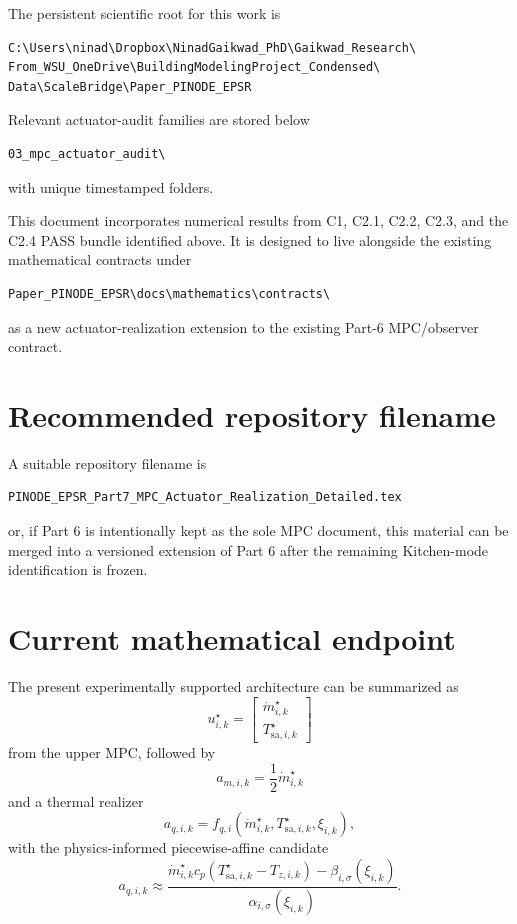 \documentclass[11pt]{article}
\newcommand{\mdot}{\dot m}
\begin{document}
The persistent scientific root for this work is
\begin{verbatim}
C:\Users\ninad\Dropbox\NinadGaikwad_PhD\Gaikwad_Research\
From_WSU_OneDrive\BuildingModelingProject_Condensed\
Data\ScaleBridge\Paper_PINODE_EPSR
\end{verbatim}

Relevant actuator-audit families are stored below
\begin{verbatim}
03_mpc_actuator_audit\
\end{verbatim}
with unique timestamped folders.

This document incorporates numerical results from C1, C2.1, C2.2, C2.3, and
the C2.4 PASS bundle identified above.  It is designed to live alongside the
existing mathematical contracts under
\begin{verbatim}
Paper_PINODE_EPSR\docs\mathematics\contracts\
\end{verbatim}
as a new actuator-realization extension to the existing Part-6 MPC/observer
contract.

\section{Recommended repository filename}

A suitable repository filename is
\begin{verbatim}
PINODE_EPSR_Part7_MPC_Actuator_Realization_Detailed.tex
\end{verbatim}
or, if Part 6 is intentionally kept as the sole MPC document, this material
can be merged into a versioned extension of Part 6 after the remaining
Kitchen-mode identification is frozen.

\section{Current mathematical endpoint}

The present experimentally supported architecture can be summarized as
\begin{equation}
\boxed{
u_{i,k}^{\star}
=
\begin{bmatrix}
\mdot_{i,k}^{\star}\\
T_{\mathrm{sa},i,k}^{\star}
\end{bmatrix}
}
\end{equation}
from the upper MPC, followed by
\begin{equation}
\boxed{
a_{m,i,k}
=
\frac12\mdot_{i,k}^{\star}
}
\end{equation}
and a thermal realizer
\begin{equation}
\boxed{
a_{q,i,k}
=
f_{q,i}
\left(
\mdot_{i,k}^{\star},
T_{\mathrm{sa},i,k}^{\star},
\xi_{i,k}
\right),
}
\end{equation}
with the physics-informed piecewise-affine candidate
\begin{equation}
\boxed{
a_{q,i,k}
\approx
\frac{
\mdot_{i,k}^{\star}c_p
(T_{\mathrm{sa},i,k}^{\star}-T_{z,i,k})
-
\beta_{i,\sigma}(\xi_{i,k})
}{
\alpha_{i,\sigma}(\xi_{i,k})
}.
}
\label{eq:current-endpoint}
\end{equation}
\end{document}
